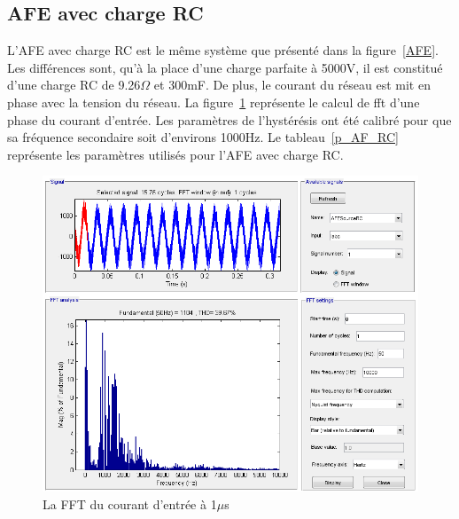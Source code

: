 \documentclass[11pt,letterpaper,final]{report}
\begin{document}
\clearpage
\subsection{AFE avec charge RC}
L'AFE avec charge RC est le même système que présenté dans la figure~\ref{AFE}. Les différences sont, qu'à la place d'une charge parfaite à 5000V, il est constitué d'une charge RC de 9.26$\Omega$ et 300mF.
De plus, le courant du réseau est mit en phase avec la tension du réseau. La figure~\ref{fft_RC} représente le calcul de fft d'une phase du courant d'entrée. Les paramètres de l'hystérésis ont été calibré pour que sa fréquence secondaire soit d'environs 1000Hz. Le tableau~\ref{p_AF_RC} représente les paramètres utilisés pour l'AFE avec charge RC.

\begin{figure}[htb]
\centering
\includegraphics[scale=0.5]{Fig/AFERC/FFTAnalysisToolResult5u.png}
\caption{La FFT du courant d'entrée à 1$\mu$s}
\label{fft_RC}
\end{figure}
\end{document}

